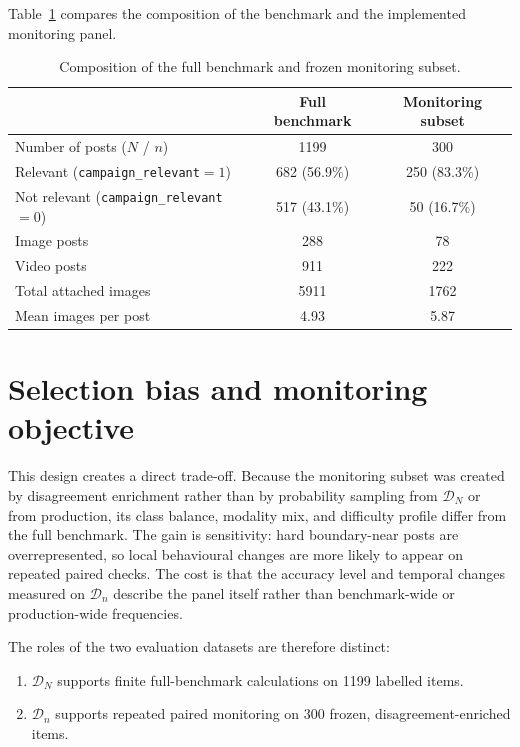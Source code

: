 Table~\ref{tab:dataset-summary} compares the composition of the benchmark and the implemented monitoring panel.

\begin{table}[H]
    \centering
    \caption[Benchmark and monitoring subset]{Composition of the full benchmark and frozen monitoring subset.}
    \label{tab:dataset-summary}
    \begin{tabular}{lcc}
        \toprule
        & Full benchmark & Monitoring subset \\
        \midrule
        Number of posts (\(N\) / \(n\)) & 1199 & 300 \\
        Relevant (\texttt{campaign\_relevant}${}=1$) & 682 (56.9\%) & 250 (83.3\%) \\
        Not relevant (\texttt{campaign\_relevant}${}=0$) & 517 (43.1\%) & 50 (16.7\%) \\
        Image posts & 288 & 78 \\
        Video posts & 911 & 222 \\
        Total attached images & 5911 & 1762 \\
        Mean images per post & 4.93 & 5.87 \\
        \bottomrule
    \end{tabular}
\end{table}

\section{Selection bias and monitoring objective}
\label{sec:selection-bias}

This design creates a direct trade-off. Because the monitoring subset was created by disagreement enrichment rather than by probability sampling from \(\mathcal{D}_N\) or from production, its class balance, modality mix, and difficulty profile differ from the full benchmark. The gain is sensitivity: hard boundary-near posts are overrepresented, so local behavioural changes are more likely to appear on repeated paired checks. The cost is that the accuracy level and temporal changes measured on \(\mathcal{D}_n\) describe the panel itself rather than benchmark-wide or production-wide frequencies.

The roles of the two evaluation datasets are therefore distinct:
\begin{enumerate}
    \item \(\mathcal{D}_N\) supports finite full-benchmark calculations on 1199 labelled items.
    \item \(\mathcal{D}_n\) supports repeated paired monitoring on 300 frozen, disagreement-enriched items.
\end{enumerate}

